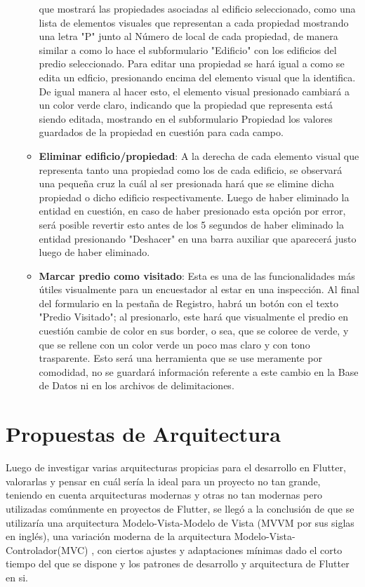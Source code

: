 \begin{itemize}
\begin{itemize}
                    que mostrará las propiedades asociadas al edificio seleccionado, como una lista de elementos visuales que representan a cada propiedad mostrando una letra "P" junto
                    al Número de local de cada propiedad, de manera similar a como lo hace el subformulario "Edificio" con los edificios del predio seleccionado.
                    Para editar una propiedad se hará igual a como se edita un edficio, presionando encima del elemento visual que la identifica. De igual manera al hacer esto, el elemento visual
                    presionado cambiará a un color verde claro, indicando que la propiedad que representa está siendo editada, mostrando en el subformulario Propiedad los valores guardados
                    de la propiedad en cuestión para cada campo.
              \item \textbf{Eliminar edificio/propiedad}: A la derecha de cada elemento visual que representa tanto una propiedad como los de cada edificio, se observará una pequeña cruz
                    la cuál al ser presionada hará que se elimine dicha propiedad o dicho edificio respectivamente. Luego de haber eliminado la entidad en cuestión, en caso de haber presionado
                    esta opción por error, será posible revertir esto antes de los 5 segundos de haber eliminado la entidad presionando "Deshacer" en una barra auxiliar que aparecerá justo luego de
                    haber eliminado.
              \item \textbf{Marcar predio como visitado}: Esta es una de las funcionalidades más útiles visualmente para un encuestador al estar en una inspección. Al final del formulario en la pestaña
                    de Registro, habrá un botón con el texto "Predio Visitado"; al presionarlo, este hará que visualmente el predio en cuestión cambie de color en sus border, o sea, que se coloree
                    de verde, y que se rellene con un color verde un poco mas claro y con tono trasparente. Esto será una herramienta que se use meramente por comodidad, no se guardará información
                    referente a este cambio en la Base de Datos ni en los archivos de delimitaciones.
          \end{itemize}

\end{itemize}
\section{Propuestas de Arquitectura}
Luego de investigar varias arquitecturas propicias para el desarrollo en Flutter, valorarlas y pensar en cuál sería la ideal para un proyecto no tan grande,
teniendo en cuenta arquitecturas modernas y otras no tan modernas pero utilizadas comúnmente en proyectos de Flutter, se llegó a la conclusión de que se utilizaría
una arquitectura Modelo-Vista-Modelo de Vista (MVVM por sus siglas en inglés)\cite{MVVM}, una variación moderna de la arquitectura Modelo-Vista-Controlador(MVC) \cite{MVC},
con ciertos ajustes y adaptaciones mínimas dado el corto tiempo del que se dispone y los patrones de desarrollo y arquitectura de Flutter en si.
